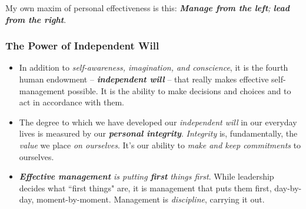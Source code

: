 \documentclass[11pt]{article}
\begin{document}
My own maxim of personal effectiveness is this: \emph{\textbf{Manage from the left}; \textbf{lead from the right}}.
\subsubsection{The Power of Independent Will}
\begin{itemize}
\item In addition to \emph{self-awareness, imagination, and conscience}, it is the fourth human endowment -- \emph{\textbf{independent will}} -- that really makes effective self-management possible. It is the ability to make decisions and choices and to act in accordance with them.

\item The degree to which we have developed our \emph{independent will} in our everyday lives is measured by our \emph{\textbf{personal integrity}}. \emph{Integrity} is, fundamentally, the \emph{value} we place \emph{on ourselves}. It's our ability to \emph{make and keep commitments} to ourselves.

\item \emph{\textbf{Effective management} is putting \textbf{first} things first}. While leadership decides what ``first things" are, it is management that puts them first, day-by-day, moment-by-moment. Management is \emph{discipline}, carrying it out.
\end{itemize}
\end{document}
